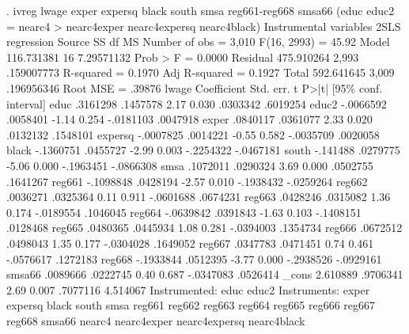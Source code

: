 . ivreg lwage exper expersq black south smsa reg661-reg668 smsa66 (educ educ2 = nearc4
>  nearc4exper nearc4expersq nearc4black)
{\smallskip}
Instrumental variables 2SLS regression
{\smallskip}
      Source {\VBAR}       SS           df       MS      Number of obs   =     3,010
   F(16, 2993)     =     45.92
       Model {\VBAR}  116.731381        16  7.29571132   Prob > F        =    0.0000
    Residual {\VBAR}  475.910264     2,993  .159007773   R-squared       =    0.1970
   Adj R-squared   =    0.1927
       Total {\VBAR}  592.641645     3,009  .196956346   Root MSE        =    .39876
{\smallskip}
       lwage {\VBAR} Coefficient  Std. err.      t    P>|t|     [95\% conf. interval]
        educ {\VBAR}   .3161298   .1457578     2.17   0.030     .0303342    .6019254
       educ2 {\VBAR}  -.0066592   .0058401    -1.14   0.254    -.0181103    .0047918
       exper {\VBAR}   .0840117   .0361077     2.33   0.020     .0132132    .1548101
     expersq {\VBAR}  -.0007825   .0014221    -0.55   0.582    -.0035709    .0020058
       black {\VBAR}  -.1360751   .0455727    -2.99   0.003    -.2254322   -.0467181
       south {\VBAR}   -.141488   .0279775    -5.06   0.000    -.1963451   -.0866308
        smsa {\VBAR}   .1072011   .0290324     3.69   0.000     .0502755    .1641267
      reg661 {\VBAR}  -.1098848   .0428194    -2.57   0.010    -.1938432   -.0259264
      reg662 {\VBAR}   .0036271   .0325364     0.11   0.911    -.0601688    .0674231
      reg663 {\VBAR}   .0428246   .0315082     1.36   0.174    -.0189554    .1046045
      reg664 {\VBAR}  -.0639842   .0391843    -1.63   0.103    -.1408151    .0128468
      reg665 {\VBAR}   .0480365   .0445934     1.08   0.281    -.0394003    .1354734
      reg666 {\VBAR}   .0672512   .0498043     1.35   0.177    -.0304028    .1649052
      reg667 {\VBAR}   .0347783   .0471451     0.74   0.461    -.0576617    .1272183
      reg668 {\VBAR}  -.1933844   .0512395    -3.77   0.000    -.2938526   -.0929161
      smsa66 {\VBAR}   .0089666   .0222745     0.40   0.687    -.0347083    .0526414
       _cons {\VBAR}   2.610889   .9706341     2.69   0.007     .7077116    4.514067
Instrumented: educ educ2
 Instruments: exper expersq black south smsa reg661 reg662 reg663 reg664
              reg665 reg666 reg667 reg668 smsa66 nearc4 nearc4exper
              nearc4expersq nearc4black
{\smallskip}
